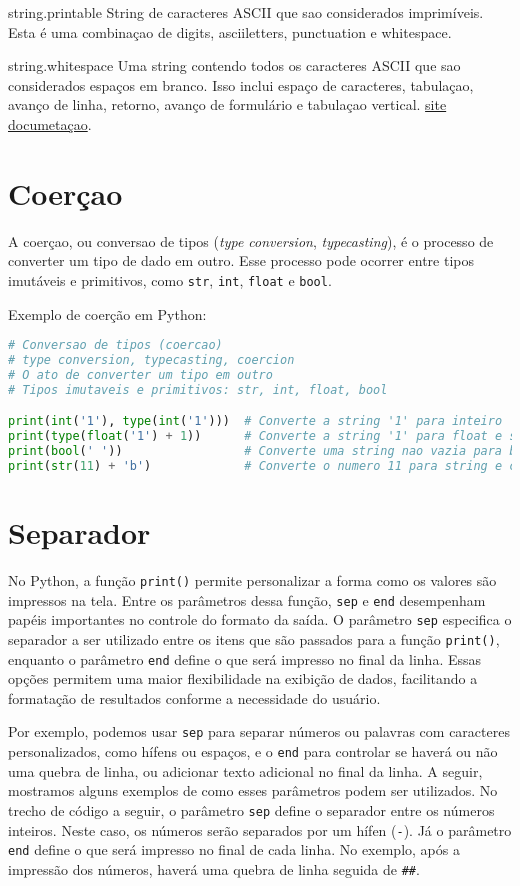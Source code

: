 \documentclass{article}
\begin{document}
string.printable
String de caracteres ASCII que sao considerados imprimíveis. Esta é uma combinaçao de digits, asciiletters, punctuation e whitespace.

string.whitespace
Uma string contendo todos os caracteres ASCII que sao considerados espaços em branco. Isso inclui espaço de caracteres, tabulaçao, avanço de linha, retorno, avanço de formulário e tabulaçao vertical.
\href{https://docs.python.org/pt-br/3/library/string.html}{site documetaçao}.
\section{Coerçao}

A coerçao, ou conversao de tipos (\emph{type conversion}, \emph{typecasting}), é o processo de converter um tipo de dado em outro. Esse processo pode ocorrer entre tipos imutáveis e primitivos, como \texttt{str}, \texttt{int}, \texttt{float} e \texttt{bool}.

Exemplo de coerção em Python:

\begin{lstlisting}[language=Python]
# Conversao de tipos (coercao)
# type conversion, typecasting, coercion
# O ato de converter um tipo em outro
# Tipos imutaveis e primitivos: str, int, float, bool

print(int('1'), type(int('1')))  # Converte a string '1' para inteiro
print(type(float('1') + 1))      # Converte a string '1' para float e soma 1
print(bool(' '))                 # Converte uma string nao vazia para booleano (True)
print(str(11) + 'b')             # Converte o numero 11 para string e concatena 'b'
\end{lstlisting}

\section{Separador}
No Python, a função \texttt{print()} permite personalizar a forma como os valores são impressos na tela. Entre os parâmetros dessa função, \texttt{sep} e \texttt{end} desempenham papéis importantes no controle do formato da saída. O parâmetro \texttt{sep} especifica o separador a ser utilizado entre os itens que são passados para a função \texttt{print()}, enquanto o parâmetro \texttt{end} define o que será impresso no final da linha. Essas opções permitem uma maior flexibilidade na exibição de dados, facilitando a formatação de resultados conforme a necessidade do usuário.

Por exemplo, podemos usar \texttt{sep} para separar números ou palavras com caracteres personalizados, como hífens ou espaços, e o \texttt{end} para controlar se haverá ou não uma quebra de linha, ou adicionar texto adicional no final da linha. A seguir, mostramos alguns exemplos de como esses parâmetros podem ser utilizados.
No trecho de código a seguir, o parâmetro \texttt{sep} define o separador entre os números inteiros. Neste caso, os números serão separados por um hífen (\texttt{-}). Já o parâmetro \texttt{end} define o que será impresso no final de cada linha. No exemplo, após a impressão dos números, haverá uma quebra de linha seguida de \texttt{\#\#}.
\end{document}
